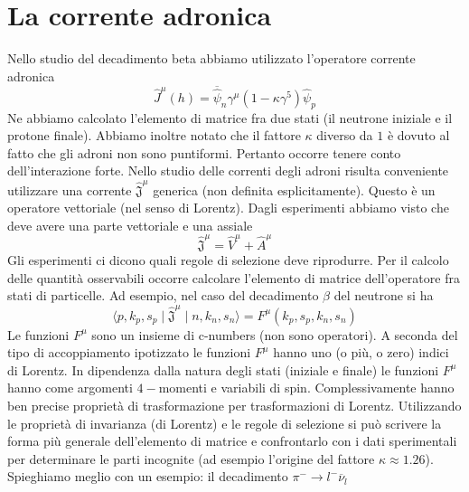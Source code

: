 \section{La corrente adronica}
Nello studio del decadimento beta abbiamo utilizzato l'operatore corrente adronica 
$$
\hat{J}^\mu (h) = \overline{\hat{\psi}}_n \gamma^\mu (1 - \kappa \gamma^5) \hat{\psi}_p
$$
Ne abbiamo calcolato l'elemento di matrice fra due stati (il neutrone iniziale e il protone finale). Abbiamo inoltre notato che il fattore $\kappa$ diverso da $1$ è dovuto al fatto che gli adroni non sono puntiformi. Pertanto occorre tenere conto dell'interazione forte. Nello studio delle correnti degli adroni risulta conveniente utilizzare una corrente $\hat{\mathfrak{J}}^\mu$ generica (non definita esplicitamente). Questo è un operatore vettoriale (nel senso di Lorentz). Dagli esperimenti abbiamo visto che deve avere una parte vettoriale e una assiale
$$
\hat{\mathfrak{J}}^\mu = \hat{V}^\mu + \hat{A}^\mu
$$
Gli esperimenti ci dicono quali regole di selezione deve riprodurre. Per il calcolo delle quantità osservabili occorre calcolare l'elemento di matrice dell'operatore fra stati di particelle. Ad esempio, nel caso del decadimento $\beta$ del neutrone si ha
$$
\langle p, k_p, s_p \mid \hat{\mathfrak{J}}^\mu \mid n, k_n, s_n \rangle = F^\mu (k_p, s_p, k_n, s_n)
$$
Le funzioni $F^\mu$ sono un insieme di c-numbers (non sono operatori). A seconda del tipo di accoppiamento ipotizzato le funzioni $F^\mu$ hanno uno (o più, o zero) indici di Lorentz. In dipendenza dalla natura degli stati (iniziale e finale) le funzioni $F^\mu$ hanno come argomenti $4-$momenti e variabili di spin. Complessivamente hanno ben precise proprietà di trasformazione per trasformazioni di Lorentz. Utilizzando le proprietà di invarianza (di Lorentz) e le regole di selezione si può scrivere la forma più generale dell'elemento di matrice e confrontarlo con i dati sperimentali per determinare le parti incognite (ad esempio l'origine del fattore $\kappa\approx1.26$). Spieghiamo meglio con un esempio: il decadimento $\pi^-\to l^-\overline{\nu}_l$
